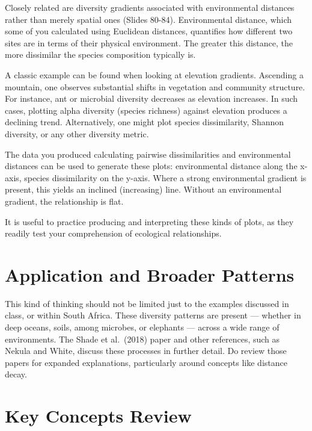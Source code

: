 \documentclass[
  11pt,
]{book}
\begin{document}
Closely related are diversity gradients associated with environmental
distances rather than merely spatial ones (Slides 80-84). Environmental
distance, which some of you calculated using Euclidean distances,
quantifies how different two sites are in terms of their physical
environment. The greater this distance, the more dissimilar the species
composition typically is.

A classic example can be found when looking at elevation gradients.
Ascending a mountain, one observes substantial shifts in vegetation and
community structure. For instance, ant or microbial diversity decreases
as elevation increases. In such cases, plotting alpha diversity (species
richness) against elevation produces a declining trend. Alternatively,
one might plot species dissimilarity, Shannon diversity, or any other
diversity metric.

The data you produced calculating pairwise dissimilarities and
environmental distances can be used to generate these plots:
environmental distance along the x-axis, species dissimilarity on the
y-axis. Where a strong environmental gradient is present, this yields an
inclined (increasing) line. Without an environmental gradient, the
relationship is flat.

It is useful to practice producing and interpreting these kinds of
plots, as they readily test your comprehension of ecological
relationships.

\section{Application and Broader
Patterns}\label{application-and-broader-patterns}

This kind of thinking should not be limited just to the examples
discussed in class, or within South Africa. These diversity patterns are
present --- whether in deep oceans, soils, among microbes, or elephants
--- across a wide range of environments. The Shade et al.~(2018) paper
and other references, such as Nekula and White, discuss these processes
in further detail. Do review those papers for expanded explanations,
particularly around concepts like distance decay.

\section{Key Concepts Review}\label{key-concepts-review}
\end{document}
